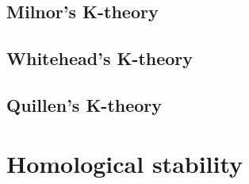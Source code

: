\documentclass{book}
\begin{document}
\section{Milnor's K-theory}


\section{Whitehead's K-theory}

\section{Quillen's K-theory}



\chapter{Homological stability}


\printbibliography %
\end{document}
